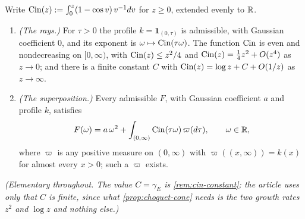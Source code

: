 \begin{lemma}\label{lem:cin-rays}
\leanok
{}
Write $\operatorname{Cin}(z) := \int_0^z (1 - \cos v)\,v^{-1}dv$ for $z \ge 0$, extended evenly to $\mathbb{R}$.
\begin{enumerate}
\item \emph{(The rays.)} For $\tau > 0$ the profile $k = \mathbf 1_{(0,\tau)}$ is admissible,
with Gaussian coefficient $0$, and its exponent is $\omega \mapsto \operatorname{Cin}(\tau\omega)$. The
function $\operatorname{Cin}$ is even and nondecreasing on $[0,\infty)$, with $\operatorname{Cin}(z) \le z^2/4$ and
$\operatorname{Cin}(z) = \tfrac14 z^2 + O(z^4)$ as $z \to 0$; and there is a finite constant $C$ with
$\operatorname{Cin}(z) = \log z + C + O(1/z)$ as $z \to \infty$.
\item \emph{(The superposition.)} Every admissible $F$, with Gaussian coefficient $a$ and
profile $k$, satisfies
\begin{equation}\label{eq:cone-superposition}
  F(\omega) = a\,\omega^2 + \int_{(0,\infty)} \operatorname{Cin}(\tau\omega)\,\varpi(d\tau),
  \qquad \omega \in \mathbb{R},
\end{equation}
where $\varpi$ is any positive measure on $(0,\infty)$ with $\varpi((x,\infty)) = k(x)$ for
almost every $x > 0$; such a $\varpi$ exists.
\end{enumerate}
\statusT\quad\emph{(Elementary throughout. The value $C = \gamma_E$ is
\ref{rem:cin-constant}; the article uses only that $C$ is finite, since what
\ref{prop:choquet-cone} needs is the two growth rates $z^2$ and $\log z$ and nothing else.)}
\end{lemma}

